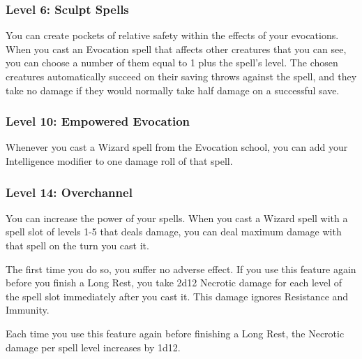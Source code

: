 \documentclass{article}
\begin{document}
\vspace{1em}

\subsubsection*{ Level 6: Sculpt Spells }

You can create pockets of relative safety within the effects of your evocations. When you cast an Evocation spell that affects other creatures that you can see, you can choose a number of them equal to 1 plus the spell's level. The chosen creatures automatically succeed on their saving throws against the spell, and they take no damage if they would normally take half damage on a successful save.

\vspace{1em}

\subsubsection*{ Level 10: Empowered Evocation }

Whenever you cast a Wizard spell from the Evocation school, you can add your Intelligence modifier to one damage roll of that spell.

\vspace{1em}

\subsubsection*{ Level 14: Overchannel }

You can increase the power of your spells. When you cast a Wizard spell with a spell slot of levels 1-5 that deals damage, you can deal maximum damage with that spell on the turn you cast it.

The first time you do so, you suffer no adverse effect. If you use this feature again before you finish a Long Rest, you take 2d12 Necrotic damage for each level of the spell slot immediately after you cast it. This damage ignores Resistance and Immunity.

Each time you use this feature again before finishing a Long Rest, the Necrotic damage per spell level increases by 1d12.

\vspace{1em}
\end{document}
